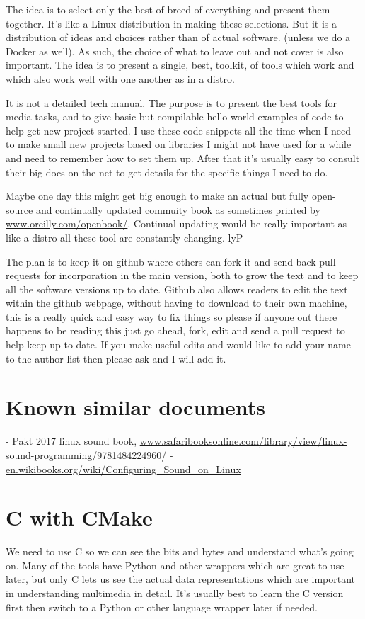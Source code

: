 \documentclass[oneside,english]{scrbook}
\begin{document}
The idea is to select only the best of breed of everything and present them together. It's like a Linux distribution in making these selections. But it is a distribution of ideas and choices rather than of actual software. (unless we do a Docker as well).   As such, the choice of what to leave out and not cover is also important. The idea is to present a single, best, toolkit, of tools which work and which also work well with one another as in a distro.

It is not a detailed tech manual. The purpose is to present the best tools for media tasks, and to give basic but compilable hello-world examples of code to help get new project started. I use these code snippets all the time when I need to make small new projects based on libraries I might not have used for a while and need to remember how to set them up.  After that it's usually easy to consult their big docs on the net to get details for the specific things I need to do.

Maybe one day this might get big enough to make an actual but fully open-source and continually updated commuity book as sometimes printed by \url{www.oreilly.com/openbook/}.  Continual updating would be really important as like a distro all these tool are constantly changing.
lyP

The plan is to keep it on github where others can fork it and send back pull requests for incorporation in the main version, both to grow the text and to keep all the software versions up to date. Github also allows readers to edit the text within the github webpage, without having to download to their own machine, this is a really quick and easy way to fix things so please if anyone out there happens to be reading this just go ahead, fork, edit and send a pull request to help keep up to date. If you make useful edits and would like to add your name to the author list then please ask and I will add it.

\section{Known similar documents}
- Pakt 2017 linux sound book, \url{www.safaribooksonline.com/library/view/linux-sound-programming/9781484224960/}
- \url{en.wikibooks.org/wiki/Configuring_Sound_on_Linux} 
\section{C with CMake}

We need to use C so we can see the bits and bytes and understand what's going on.  Many of the tools have Python and other wrappers which are great to use later, but only C lets us see the actual data representations which are important in understanding multimedia in detail.  It's usually best to learn the C version first then switch to a Python or other language wrapper later if needed.
\end{document}
